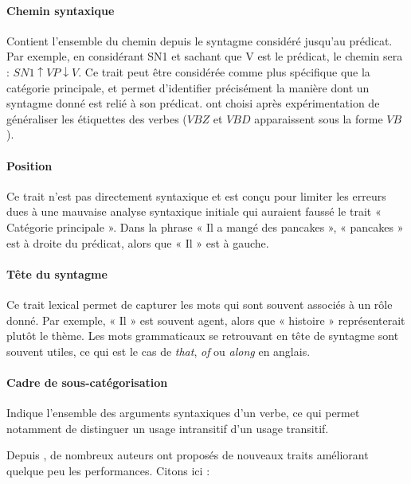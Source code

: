 \paragraph{Chemin syntaxique} Contient l'ensemble du chemin depuis le syntagme
considéré jusqu'au prédicat. Par exemple, en considérant SN1 et sachant que V
est le prédicat, le chemin sera : $SN1 \uparrow VP \downarrow V$. Ce trait peut
être considérée comme plus spécifique que la catégorie principale, et permet
d'identifier précisément la manière dont un syntagme donné est relié à son
prédicat. \cite{gildea2002automatic} ont choisi après expérimentation de
généraliser les étiquettes des verbes ($VBZ$ et $VBD$ apparaissent sous la
forme $VB$).

\paragraph{Position} Ce trait n'est pas directement syntaxique et est conçu
pour limiter les erreurs dues à une mauvaise analyse syntaxique initiale qui
auraient faussé le trait « Catégorie principale ». Dans la phrase « Il a mangé
des pancakes », « pancakes » est à droite du prédicat, alors que « Il » est à
gauche.

\paragraph{Tête du syntagme} Ce trait lexical permet de capturer les mots qui
sont souvent associés à un rôle donné. Par exemple, « Il » est souvent agent,
alors que « histoire » représenterait plutôt le thème. Les mots grammaticaux se
retrouvant en tête de syntagme sont souvent utiles, ce qui est le cas de
\textit{that}, \textit{of} ou \textit{along} en anglais.

\paragraph{Cadre de sous-catégorisation} Indique l'ensemble des arguments
syntaxiques d'un verbe, ce qui permet notamment de distinguer un usage
intransitif d'un usage transitif.

Depuis \cite{gildea2002automatic}, de nombreux auteurs ont proposés de nouveaux
traits améliorant quelque peu les performances. Citons ici :

